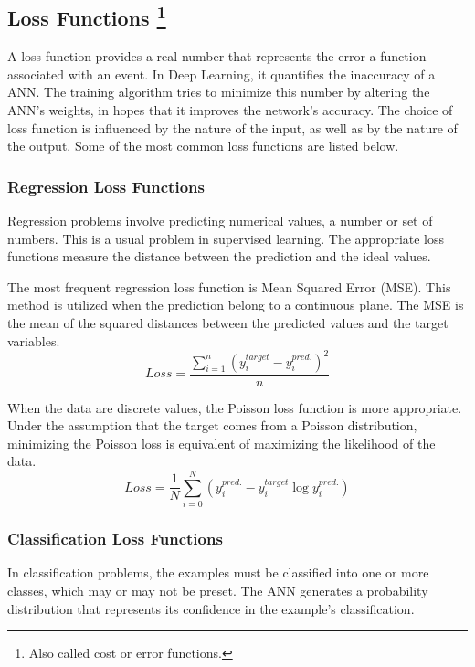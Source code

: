 \subsection[Loss Functions]{Loss Functions \footnote{Also called cost or error functions.}}
A loss function\cite{loss_functions} provides a real number that represents the error a function associated with an event. In Deep Learning, it quantifies the inaccuracy of a ANN. The training algorithm tries to minimize this number by altering the ANN's weights, in hopes that it improves the network's accuracy. The choice of loss function is influenced by the nature of the input, as well as by the nature of the output. Some of the most common loss functions are listed below.

\subsubsection{Regression Loss Functions}
Regression problems involve predicting numerical values, a number or set of numbers. This is a usual problem in supervised learning. The appropriate loss functions measure the distance between the prediction and the ideal values.

The most frequent regression loss function is Mean Squared Error (MSE). This method is utilized when the prediction belong to a continuous plane. The MSE is the mean of the squared distances between the predicted values and the target variables.
\begin{equation}
    	Loss = \frac{ \sum_{i=1}^{n} \left( y_i^{target} - y_i^{pred.} \right)^2 } {n}
    	\label{eqn:Mean Squared Error}
\end{equation}

When the data are discrete values, the Poisson loss function is more appropriate. Under the assumption that the target comes from a Poisson distribution, minimizing the Poisson loss is equivalent of maximizing the likelihood of the data.
\begin{equation}
    	Loss = \frac{1}{N} \sum_{i=0}^{N} \left( y_i^{pred.} - y_i^{target}\log y_i^{pred.} \right)
    	\label{eqn:Poisson Error}
\end{equation}

\subsubsection{Classification Loss Functions}
In classification problems, the examples must be classified into one or more classes, which may or may not be preset. The ANN generates a probability distribution that represents its confidence in the example's classification.

